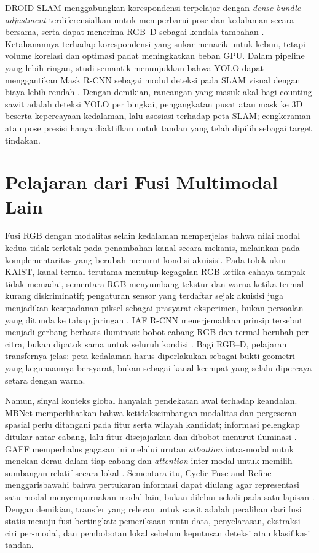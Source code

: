 DROID-SLAM menggabungkan korespondensi terpelajar dengan \textit{dense bundle adjustment} terdiferensialkan untuk memperbarui pose dan kedalaman secara bersama, serta dapat menerima RGB--D sebagai kendala tambahan \cite{teed2021droidslam}. Ketahanannya terhadap korespondensi yang sukar menarik untuk kebun, tetapi volume korelasi dan optimasi padat meningkatkan beban GPU. Dalam pipeline yang lebih ringan, studi semantik menunjukkan bahwa YOLO dapat menggantikan Mask R-CNN sebagai modul deteksi pada SLAM visual dengan biaya lebih rendah \cite{soares2019visualslam}. Dengan demikian, rancangan yang masuk akal bagi counting sawit adalah deteksi YOLO per bingkai, pengangkatan pusat atau mask ke 3D beserta kepercayaan kedalaman, lalu asosiasi terhadap peta SLAM; cengkeraman atau pose presisi hanya diaktifkan untuk tandan yang telah dipilih sebagai target tindakan.


\section{Pelajaran dari Fusi Multimodal Lain}\label{sec:multimodal}

Fusi RGB dengan modalitas selain kedalaman memperjelas bahwa nilai modal kedua tidak terletak pada penambahan kanal secara mekanis, melainkan pada komplementaritas yang berubah menurut kondisi akuisisi. Pada tolok ukur KAIST, kanal termal terutama menutup kegagalan RGB ketika cahaya tampak tidak memadai, sementara RGB menyumbang tekstur dan warna ketika termal kurang diskriminatif; pengaturan sensor yang terdaftar sejak akuisisi juga menjadikan kesepadanan piksel sebagai prasyarat eksperimen, bukan persoalan yang ditunda ke tahap jaringan \cite{hwang2015kaist}. IAF R-CNN menerjemahkan prinsip tersebut menjadi gerbang berbasis iluminasi: bobot cabang RGB dan termal berubah per citra, bukan dipatok sama untuk seluruh kondisi \cite{li2019illumination}. Bagi RGB--D, pelajaran transfernya jelas: peta kedalaman harus diperlakukan sebagai bukti geometri yang kegunaannya bersyarat, bukan sebagai kanal keempat yang selalu dipercaya setara dengan warna.

Namun, sinyal konteks global hanyalah pendekatan awal terhadap keandalan. MBNet memperlihatkan bahwa ketidakseimbangan modalitas dan pergeseran spasial perlu ditangani pada fitur serta wilayah kandidat; informasi pelengkap ditukar antar-cabang, lalu fitur disejajarkan dan dibobot menurut iluminasi \cite{zhou2020mbnet}. GAFF memperhalus gagasan ini melalui urutan \textit{attention} intra-modal untuk menekan derau dalam tiap cabang dan \textit{attention} inter-modal untuk memilih sumbangan relatif secara lokal \cite{zhang2021gaff}. Sementara itu, Cyclic Fuse-and-Refine menggarisbawahi bahwa pertukaran informasi dapat diulang agar representasi satu modal menyempurnakan modal lain, bukan dilebur sekali pada satu lapisan \cite{zhang2020cfr}. Dengan demikian, transfer yang relevan untuk sawit adalah peralihan dari fusi statis menuju fusi bertingkat: pemeriksaan mutu data, penyelarasan, ekstraksi ciri per-modal, dan pembobotan lokal sebelum keputusan deteksi atau klasifikasi tandan.

